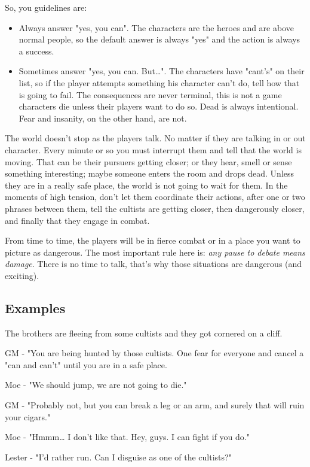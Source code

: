 \documentclass[11pt]{article}
\begin{document}
So, you guidelines are:
\begin{itemize}
\item Always answer "yes, you can". The characters are the heroes and are above normal people, so the default answer is always "yes" and the action is always a success.
\item Sometimes answer "yes, you can. But\ldots{}". The characters have "cant's" on their list, so if the player attempts something his character can't do, tell how that is going to fail. The consequences are never terminal, this is not a game characters die unless their players want to do so. Dead is always intentional. Fear and insanity, on the other hand, are not.
\end{itemize}

The world doesn't stop as the players talk. No matter if they are talking in or out character. Every minute or so you must interrupt them and tell that the world is moving. That can be their pursuers getting closer; or they hear, smell or sense something interesting; maybe someone enters the room and drops dead. Unless they are in a really safe place, the world is not going to wait for them. In the moments of high tension, don't let them coordinate their actions, after one or two phrases between them, tell the cultists are getting closer, then dangerously closer, and finally that they engage in combat.

From time to time, the players will be in fierce combat or in a place you want to picture as dangerous. The most important rule here is: \textit{any pause to debate means damage}. There is no time to talk, that's why those situations are dangerous (and exciting).

\subsection{Examples}
\label{sec:orgcef5c31}
The brothers are fleeing from some cultists and they got cornered on a cliff.

GM - "You are being hunted by those cultists. One fear for everyone and cancel a "can and can't" until you are in a safe place.

Moe - "We should jump, we are not going to die."

GM - "Probably not, but you can break a leg or an arm, and surely that will ruin your cigars."

Moe - "Hmmm\ldots{} I don't like that. Hey, guys. I can fight if you do."

Lester - "I'd rather run. Can I disguise as one of the cultists?"
\end{document}
